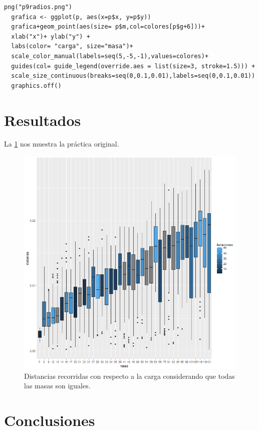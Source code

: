\documentclass[a4paper]{article}
\begin{document}
\begin{lstlisting}[frame=single]
  png("p9radios.png")
  grafica <- ggplot(p, aes(x=p$x, y=p$y))
  grafica+geom_point(aes(size= p$m,col=colores[p$g+6]))+ 
  xlab("x")+ ylab("y") + 
  labs(color= "carga", size="masa")+
  scale_color_manual(labels=seq(5,-5,-1),values=colores)+
  guides(col= guide_legend(override.aes = list(size=3, stroke=1.5))) +
  scale_size_continuous(breaks=seq(0,0.1,0.01),labels=seq(0,0.1,0.01))
  graphics.off()
\end{lstlisting}

\section{Resultados}
La \ref*{fig:totaloriginal} nos muestra la práctica original.

\begin{figure}[h!]
\centering
\includegraphics[width=0.7\linewidth]{totaloriginal}
\caption{Distancias recorridas con respecto a la carga considerando que todas las masas son iguales.}
\label{fig:totaloriginal}
\end{figure}


\section{Conclusiones}
\end{document}
